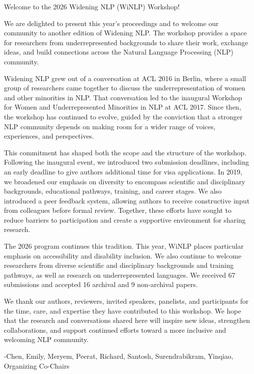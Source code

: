 Welcome to the 2026 Widening NLP (WiNLP) Workshop!

\vspace{\baselineskip}

We are delighted to present this year’s proceedings and to welcome our community to another edition of Widening NLP. The workshop provides a space for researchers from underrepresented backgrounds to share their work, exchange ideas, and build connections across the Natural Language Processing (NLP) community.

\vspace{\baselineskip}

Widening NLP grew out of a conversation at ACL 2016 in Berlin, where a small group of researchers came together to discuss the underrepresentation of women and other minorities in NLP. That conversation led to the inaugural Workshop for Women and Underrepresented Minorities in NLP at ACL 2017. Since then, the workshop has continued to evolve, guided by the conviction that a stronger NLP community depends on making room for a wider range of voices, experiences, and perspectives.

\vspace{\baselineskip}

This commitment has shaped both the scope and the structure of the workshop. Following the inaugural event, we introduced two submission deadlines, including an early deadline to give authors additional time for visa applications. In 2019, we broadened our emphasis on diversity to encompass scientific and disciplinary backgrounds, educational pathways, training, and career stages. We also introduced a peer feedback system, allowing authors to receive constructive input from colleagues before formal review. Together, these efforts have sought to reduce barriers to participation and create a supportive environment for sharing research.

\vspace{\baselineskip}

The 2026 program continues this tradition. This year, WiNLP places particular emphasis on accessibility and disability inclusion. We also continue to welcome researchers from diverse scientific and disciplinary backgrounds and training pathways, as well as research on underrepresented languages. We received 67 submissions and accepted 16 archival and 9 non-archival papers. 

\vspace{\baselineskip}

We thank our authors, reviewers, invited speakers, panelists, and participants for the time, care, and expertise they have contributed to this workshop. We hope that the research and conversations shared here will inspire new ideas, strengthen collaborations, and support continued efforts toward a more inclusive and welcoming NLP community.

\vspace{\baselineskip}

-Chen, Emily, Meryem, Peerat, Richard, Santosh, Surendrabikram, Yinqiao, Organizing Co-Chairs